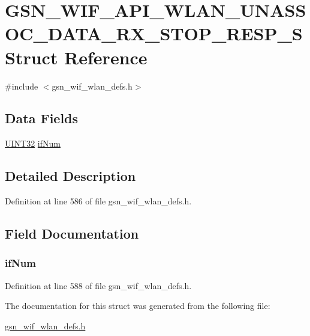 \hypertarget{a00313}{
\section{GSN\_\-WIF\_\-API\_\-WLAN\_\-UNASSOC\_\-DATA\_\-RX\_\-STOP\_\-RESP\_\-S Struct Reference}
\label{a00313}
}


{\ttfamily \#include $<$gsn\_\-wif\_\-wlan\_\-defs.h$>$}

\subsection*{Data Fields}
\begin{DoxyCompactItemize}
\item 
\hyperlink{a00660_gae1e6edbbc26d6fbc71a90190d0266018}{UINT32} \hyperlink{a00313_ab582fd779b13f74e06e2491389a60aa0}{ifNum}
\end{DoxyCompactItemize}


\subsection{Detailed Description}


Definition at line 586 of file gsn\_\-wif\_\-wlan\_\-defs.h.



\subsection{Field Documentation}
\hypertarget{a00313_ab582fd779b13f74e06e2491389a60aa0}{
\subsubsection[{ifNum}]{ {\bf ifNum}}}
\label{a00313_ab582fd779b13f74e06e2491389a60aa0}


Definition at line 588 of file gsn\_\-wif\_\-wlan\_\-defs.h.



The documentation for this struct was generated from the following file:\begin{DoxyCompactItemize}
\item 
\hyperlink{a00613}{gsn\_\-wif\_\-wlan\_\-defs.h}\end{DoxyCompactItemize}
